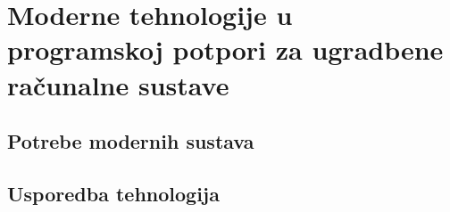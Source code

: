 \chapter{Moderne tehnologije u programskoj potpori za ugradbene računalne sustave}

\section{Potrebe modernih sustava}

\section{Usporedba tehnologija}